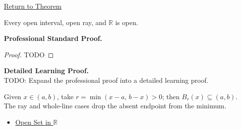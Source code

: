 \newpage
{}
\label{prf:open-interval-is-open}

\begin{remark*}[Return]
\hyperref[thm:open-interval-is-open]{Return to Theorem}
\end{remark*}

\begin{theorem*}
Every open interval, open ray, and $\mathbb{R}$ is open.
\end{theorem*}

\textbf{Professional Standard Proof.}~\\
\begin{proof}
TODO
\end{proof}

\textbf{Detailed Learning Proof.}~\\
TODO: Expand the professional proof into a detailed learning proof.

\begin{remark*}
Given $x\in(a,b)$, take $r=\min(x-a,\,b-x)>0$; then $B_{r}(x)\subseteq(a,b)$. The ray and whole-line cases drop the absent endpoint from the minimum.
\end{remark*}

\begin{dependencies}
\begin{itemize}
  \item \hyperref[def:open-set]{Open Set in $\mathbb{R}$}
\end{itemize}
\end{dependencies}
